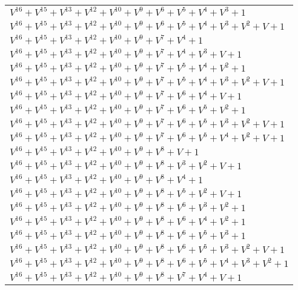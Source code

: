 \documentclass[12pt]{article}
\begin{document}
\begin{adjustwidth}{-4cm}{}
\begin{center}
\begin{longtable}{|l|}
$V^{16}  +V^{15}  +V^{13}  +V^{12}  +V^{10}  +V^{9}  +V^{6}  +V^{5}  +V^{4}  +V^{3}  + 1$ \\
$V^{16}  +V^{15}  +V^{13}  +V^{12}  +V^{10}  +V^{9}  +V^{6}  +V^{5}  +V^{4}  +V^{3}  +V^{2}  + V + 1$ \\
$V^{16}  +V^{15}  +V^{13}  +V^{12}  +V^{10}  +V^{9}  +V^{7}  +V^{4}  + 1$ \\
$V^{16}  +V^{15}  +V^{13}  +V^{12}  +V^{10}  +V^{9}  +V^{7}  +V^{4}  +V^{3}  + V + 1$ \\
$V^{16}  +V^{15}  +V^{13}  +V^{12}  +V^{10}  +V^{9}  +V^{7}  +V^{5}  +V^{4}  +V^{2}  + 1$ \\
$V^{16}  +V^{15}  +V^{13}  +V^{12}  +V^{10}  +V^{9}  +V^{7}  +V^{5}  +V^{4}  +V^{3}  +V^{2}  + V + 1$ \\
$V^{16}  +V^{15}  +V^{13}  +V^{12}  +V^{10}  +V^{9}  +V^{7}  +V^{6}  +V^{4}  + V + 1$ \\
$V^{16}  +V^{15}  +V^{13}  +V^{12}  +V^{10}  +V^{9}  +V^{7}  +V^{6}  +V^{5}  +V^{2}  + 1$ \\
$V^{16}  +V^{15}  +V^{13}  +V^{12}  +V^{10}  +V^{9}  +V^{7}  +V^{6}  +V^{5}  +V^{3}  +V^{2}  + V + 1$ \\
$V^{16}  +V^{15}  +V^{13}  +V^{12}  +V^{10}  +V^{9}  +V^{7}  +V^{6}  +V^{5}  +V^{4}  +V^{2}  + V + 1$ \\
$V^{16}  +V^{15}  +V^{13}  +V^{12}  +V^{10}  +V^{9}  +V^{8}  + V + 1$ \\
$V^{16}  +V^{15}  +V^{13}  +V^{12}  +V^{10}  +V^{9}  +V^{8}  +V^{3}  +V^{2}  + V + 1$ \\
$V^{16}  +V^{15}  +V^{13}  +V^{12}  +V^{10}  +V^{9}  +V^{8}  +V^{4}  + 1$ \\
$V^{16}  +V^{15}  +V^{13}  +V^{12}  +V^{10}  +V^{9}  +V^{8}  +V^{5}  +V^{2}  + V + 1$ \\
$V^{16}  +V^{15}  +V^{13}  +V^{12}  +V^{10}  +V^{9}  +V^{8}  +V^{6}  +V^{3}  +V^{2}  + 1$ \\
$V^{16}  +V^{15}  +V^{13}  +V^{12}  +V^{10}  +V^{9}  +V^{8}  +V^{6}  +V^{4}  +V^{2}  + 1$ \\
$V^{16}  +V^{15}  +V^{13}  +V^{12}  +V^{10}  +V^{9}  +V^{8}  +V^{6}  +V^{5}  +V^{3}  + 1$ \\
$V^{16}  +V^{15}  +V^{13}  +V^{12}  +V^{10}  +V^{9}  +V^{8}  +V^{6}  +V^{5}  +V^{3}  +V^{2}  + V + 1$ \\
$V^{16}  +V^{15}  +V^{13}  +V^{12}  +V^{10}  +V^{9}  +V^{8}  +V^{6}  +V^{5}  +V^{4}  +V^{3}  +V^{2}  + 1$ \\
$V^{16}  +V^{15}  +V^{13}  +V^{12}  +V^{10}  +V^{9}  +V^{8}  +V^{7}  +V^{4}  + V + 1$ \\

\end{longtable}
\end{center}
\end{adjustwidth}
\end{document}
